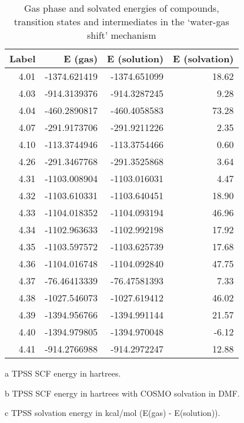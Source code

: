 \begin{table}[!htb]
\centering
 \begin{threeparttable}
  \caption[Gas phase and solvated energies for the `water-gas shift' mechanism]{Gas phase and solvated energies of compounds, transition states and intermediates in the `water-gas shift' mechanism}
    \begin{tabular}{rrrr}
    \toprule
    Label & E (gas)\tnote{a} & E (solution)\tnote{b} & E (solvation)\tnote{c} \\
    \midrule
    4.01  & -1374.621419 & -1374.651099 & 18.62 \\
    4.03  & -914.3139376 & -914.3287245 & 9.28 \\
    4.04  & -460.2890817 & -460.4058583 & 73.28 \\
    4.07  & -291.9173706 & -291.9211226 & 2.35 \\
    4.10  & -113.3744946 & -113.3754466 & 0.60 \\
    4.26  & -291.3467768 & -291.3525868 & 3.64 \\
    4.31  & -1103.008904 & -1103.016031 & 4.47 \\
    4.32  & -1103.610331 & -1103.640451 & 18.90 \\
    4.33  & -1104.018352 & -1104.093194 & 46.96 \\
    4.34  & -1102.963633 & -1102.992198 & 17.92 \\
    4.35  & -1103.597572 & -1103.625739 & 17.68 \\
    4.36  & -1104.016748 & -1104.092840 & 47.75 \\
    4.37  & -76.46413339 & -76.47581393 & 7.33 \\
    4.38  & -1027.546073 & -1027.619412 & 46.02 \\
    4.39  & -1394.956766 & -1394.991144 & 21.57 \\
    4.40  & -1394.979805 & -1394.970048 & -6.12 \\
    4.41  & -914.2766988 & -914.2972247 & 12.88 \\
    \bottomrule
    \end{tabular}%
    \begin{tablenotes}
    \item [a] TPSS SCF energy in hartrees.
    \item [b] TPSS SCF energy in hartrees with COSMO solvation in DMF.
    \item [c] TPSS solvation energy in kcal/mol (E(gas) - E(solution)).
    \end{tablenotes}
  \label{tab.wgsenergy}%
 \end{threeparttable}
\end{table}%


